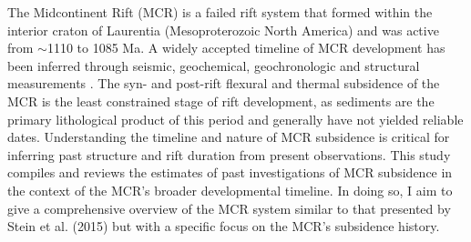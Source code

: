 \documentclass[12pt,letterpaper]{article}
\renewenvironment{abstract}
 {\small
  \begin{center}
  \bfseries \abstractname\vspace{-.5em}\vspace{0pt}
  \end{center}
  \list{}{
    \setlength{\leftmargin}{.5cm}%
    \setlength{\rightmargin}{\leftmargin}%
  }%
  \item\relax}
 {\endlist}
\begin{document}
\begin{abstract}
\hline
The Midcontinent Rift (MCR) is a failed rift system that formed within the interior craton of Laurentia (Mesoproterozoic North America) and was active from $\sim$1110 to 1085 Ma. 
A widely accepted timeline of MCR development has been inferred through seismic, geochemical, geochronologic and structural measurements \citep{Cannon1989a,Cannon1992b,White1997a,Stein2015a}. The syn- and post-rift flexural and thermal subsidence of the MCR is the least constrained stage of rift development, as sediments are the primary lithological product of this period and generally have not yielded reliable dates. Understanding the timeline and nature of MCR subsidence is critical for inferring past structure and rift duration from present observations. This study compiles and reviews the estimates of past investigations of MCR subsidence in the context of the MCR's broader developmental timeline. In doing so, I aim to give a comprehensive overview of the MCR system similar to that presented by Stein et al. (2015) but with a specific focus on the MCR's subsidence history.
\vspace{0.5em}\hline
\end{abstract}
\end{document}
